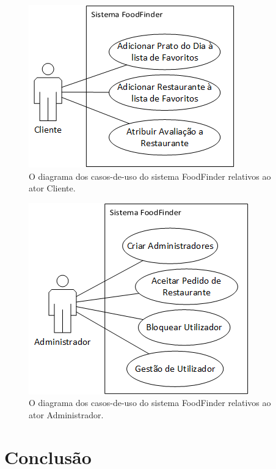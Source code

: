 \documentclass[a4paper,12pt]{report}
\begin{document}
	\begin{figure}[H]
	\begin{center}
	\includegraphics[scale=0.70]{casoUso_cliente}	
	\end{center}
	\medskip
	\caption{O diagrama dos casos-de-uso do sistema FoodFinder relativos ao ator Cliente.}
	\label{fig:casoUso_cliente}	
	\end{figure}	
	
	\begin{figure}[H]
	\begin{center}
	\includegraphics[scale=0.70]{casoUso_administrador}	
	\end{center}
	\medskip
	\caption{O diagrama dos casos-de-uso do sistema FoodFinder relativos ao ator Administrador.}
	\label{fig:casoUso_administrador}	
	\end{figure}
	

\chapter{Conclusão}	
\end{document}

